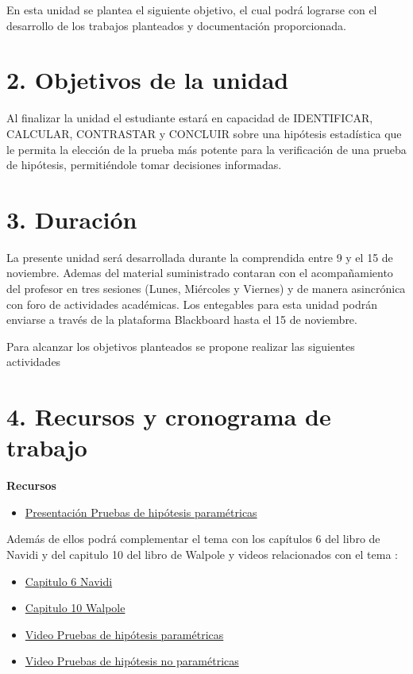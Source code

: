 \documentclass[base=hide,11pt]{elegantbook}
\begin{document}
En esta unidad se plantea el siguiente objetivo, el cual podrá lograrse con el desarrollo de los trabajos planteados y documentación proporcionada.



\section*{2. Objetivos de la unidad}
Al finalizar la unidad el estudiante estará en capacidad de
IDENTIFICAR, CALCULAR, CONTRASTAR y CONCLUIR sobre una hipótesis estadística que le permita la elección de la prueba más potente para la verificación de una prueba de hipótesis, permitiéndole tomar decisiones informadas.


\section*{3. Duración}
La presente  unidad será desarrollada durante la comprendida entre 9 y el 15 de noviembre.    
Ademas del material suministrado  contaran con el acompañamiento del profesor en tres sesiones (Lunes, Miércoles y Viernes) y de manera asincrónica con  foro de actividades académicas. Los entegables para esta unidad podrán enviarse a través de la plataforma Blackboard hasta el  15 de noviembre.

Para alcanzar los objetivos planteados se propone realizar las siguientes actividades
\newpage 
\section*{4. Recursos y cronograma de trabajo}
{\bf Recursos}
\begin{itemize}
\item \href{https://drive.google.com/open?id=17JkIdxED-k6f0V5RTFgba8KzEyIbcrs2}{Presentación Pruebas de hipótesis paramétricas}
\end{itemize}

Además de ellos  podrá complementar el tema con los capítulos 6 del libro de Navidi y del capitulo 10 del libro de Walpole  y videos relacionados con el tema :
\begin{multicols}{2}
\begin{itemize}
	\item \href{https://drive.google.com/open?id=1IbIGZBDT1zx8ErJodoLiEcdS7IRsj3r9}{Capitulo 6 Navidi}
	\item \href{https://drive.google.com/open?id=1QcYO59i9GpIV2Q4hlU02OCavdfKUYsNa}{Capitulo 10 Walpole}
	\item \href{https://www.youtube.com/watch?v=XoXwb6qYl58}{Video Pruebas de hipótesis paramétricas}
	\item \href{https://www.youtube.com/watch?v=m3YIdS2TVHk}{Video Pruebas de hipótesis no paramétricas}
	\end{itemize}
\end{multicols}
\end{document}
